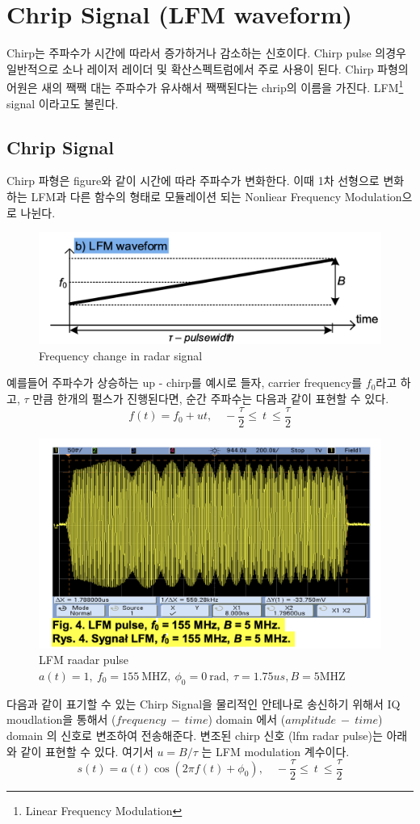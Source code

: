 \section{Chrip Signal (LFM waveform)}
Chirp는 주파수가 시간에 따라서 증가하거나 감소하는 신호이다. Chirp pulse 의경우 일반적으로 소나 레이저 레이더 및 확산스펙트럼에서 주로 사용이 된다. Chirp 파형의 어원은  새의 짹짹 대는 주파수가 유사해서 짹짹된다는 chrip의 이름을 가진다. LFM\footnote{Linear Frequency Modulation}  signal 이라고도 불린다. 
\subsection{Chrip Signal}
Chirp 파형은 figure와 같이 시간에 따라 주파수가 변화한다. 이때 1차 선형으로 변화하는 LFM과 다른 함수의 형태로 모듈레이션 되는 Nonliear Frequency Modulation으로 나뉜다.\\
    \vspace{-4mm}
    \begin{figure}[!h]\centering
		\includegraphics[width=.65\textwidth]{image/week03/1-1.png}
		\caption{\small Frequency change in radar signal}
		\vspace{-10pt}
    \end{figure}
    
예를들어 주파수가 상승하는 up - chirp를 예시로 들자, carrier frequency를 $f_0$라고 하고, $\tau$ 만큼 한개의 펄스가 진행된다면, 순간 주파수는 다음과 같이 표현할 수 있다.
$$
f(t) = f_0 + ut, \quad -\frac{\tau}{2} \leq\ t\ \leq  \frac{\tau}{2}
$$
    \vspace{-4mm}
    \begin{figure}[!h]\centering
		\includegraphics[width=.65\textwidth]{image/week03/1-2.png}
		\caption{\small LFM raadar pulse $a(t) = 1,\ f_0 = 155\ \text{MHZ},\ \phi_0 = 0\ \text{rad},\ \tau= 1.75us, B = 5\text{MHZ}$}
		\vspace{-10pt}
    \end{figure}
\clearpage
다음과 같이 표기할 수 있는 Chirp Signal을 물리적인 안테나로 송신하기 위해서 IQ moudlation을 통해서 ($frequency\ -\ time$) domain 에서 ($amplitude\ -\ time$) domain 의 신호로 변조하여 전송해준다. 
변조된 chirp 신호 (lfm radar pulse)는 아래와 같이 표현할 수 있다. 여기서 $u = B / \tau$ 는 LFM modulation 계수이다. 
$$
s(t) = a(t) \cos(2\pi f(t)+ \phi_0), \quad -\frac{\tau}{2} \leq\ t\ \leq  \frac{\tau}{2}
$$

